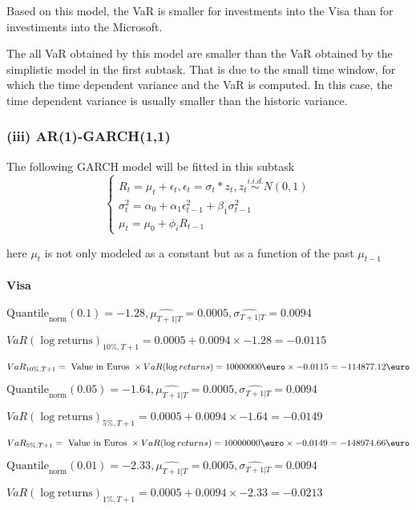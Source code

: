 Based on this model, the VaR is smaller for investments into the Visa than for investiments into the Microsoft.

The all VaR obtained by this model are smaller than the VaR obtained by the simplistic model in the first subtask. That is due to the small time window, for which the time dependent variance and the VaR is computed. In this case, the time dependent variance is usually smaller than the historic variance.

\subsubsection{(iii) AR(1)-GARCH(1,1)}
The following GARCH model will be fitted in this subtask
$$\begin{cases} R_t = \mu_t + \epsilon_t, \epsilon_t = \sigma_t  * z_t, z_t \overset{i.i.d.}{\sim} N(0,1) \\ \sigma^2_t = \alpha_0 + \alpha_1 \epsilon^2_{t-1} + \beta_1 \sigma^2_{t-1} \\ \mu_t = \mu_0 + \phi_i R_{t-1} \end{cases}$$ 


here $\mu_t$ is not only modeled as a constant but as a function of the past $\mu_{t-1}$
\paragraph{Visa}


$\text{Quantile}_\text{norm}(0.1) = -1.28,\hat{\mu_{T+1|T}} = 0.0005, \hat{\sigma_{T+1|T}} = 0.0094$

$VaR(\log \text{returns})_{10\%, T + 1} = 0.0005 + 0.0094\times-1.28 = -0.0115$

$VaR_{10\%, T + 1} = \text{ Value in Euros } \times VaR(\log returns) = 10 000 000 \text{\euro} \times-0.0115 = -114877.12 \text{\euro}$


$\text{Quantile}_\text{norm}(0.05) = -1.64,\hat{\mu_{T+1|T}} = 0.0005, \hat{\sigma_{T+1|T}} = 0.0094$

$VaR(\log \text{returns})_{5\%, T + 1} = 0.0005 + 0.0094\times-1.64 = -0.0149$

$VaR_{5\%, T + 1} = \text{ Value in Euros } \times VaR(\log returns) = 10 000 000 \text{\euro} \times-0.0149 = -148974.66 \text{\euro}$


$\text{Quantile}_\text{norm}(0.01) = -2.33,\hat{\mu_{T+1|T}} = 0.0005, \hat{\sigma_{T+1|T}} = 0.0094$

$VaR(\log \text{returns})_{1\%, T + 1} = 0.0005 + 0.0094\times-2.33 = -0.0213$

